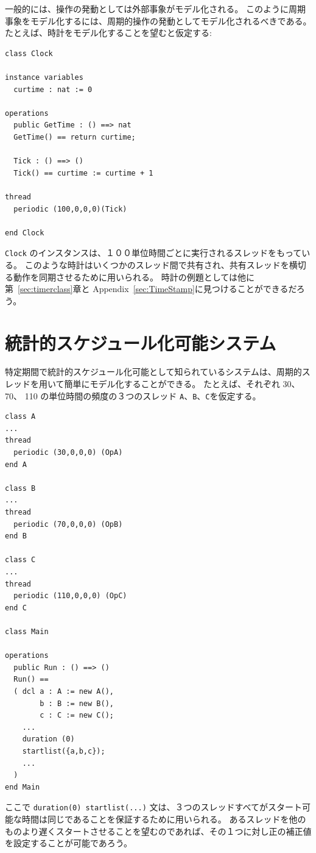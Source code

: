 \documentclass[\pformat,12pt]{jreport}
\begin{document}
一般的には、操作の発動としては外部事象がモデル化される。
このように周期事象をモデル化するには、周期的操作の発動としてモデル化されるべきである。
たとえば、時計をモデル化することを望むと仮定する:

\begin{lstlisting}
class Clock

instance variables
  curtime : nat := 0

operations
  public GetTime : () ==> nat
  GetTime() == return curtime;

  Tick : () ==> ()
  Tick() == curtime := curtime + 1

thread
  periodic (100,0,0,0)(Tick)

end Clock
\end{lstlisting}

 \texttt{Clock} のインスタンスは、１００単位時間ごとに実行されるスレッドをもっている。
このような時計はいくつかのスレッド間で共有され、共有スレッドを横切る動作を同期させるために用いられる。
時計の例題としては他に第~\ref{sec:timerclass}章と Appendix~\ref{sec:TimeStamp}に見つけることができるだろう。

\section{統計的スケジュール化可能システム}

特定期間で統計的スケジュール化可能として知られているシステムは、周期的スレッドを用いて簡単にモデル化することができる。
たとえば、それぞれ 30、 70、 110 の単位時間の頻度の３つのスレッド \texttt{A}、\texttt{B}、\texttt{C}を仮定する。

\begin{lstlisting}
class A
...
thread
  periodic (30,0,0,0) (OpA)
end A

class B
...
thread
  periodic (70,0,0,0) (OpB)
end B

class C
...
thread
  periodic (110,0,0,0) (OpC)
end C

class Main

operations
  public Run : () ==> ()
  Run() ==
  ( dcl a : A := new A(),
        b : B := new B(),
        c : C := new C();
    ...
    duration (0)
    startlist({a,b,c});
    ...
  )
end Main
\end{lstlisting}

ここで \texttt{duration(0) startlist(...)} 文は、３つのスレッドすべてがスタート可能な時間は同じであることを保証するために用いられる。
あるスレッドを他のものより遅くスタートさせることを望むのであれば、その１つに対し正の補正値を設定することが可能であろう。
\end{document}
